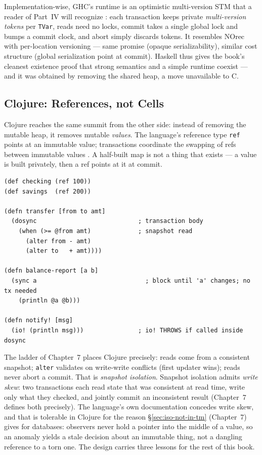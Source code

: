 Implementation-wise, GHC's runtime is an optimistic multi-version STM that a
reader of Part~IV will recognize \cite{ghcstm}: each transaction keeps private
\emph{multi-version tokens} per \texttt{TVar}, reads need no locks, commit
takes a single global lock and bumps a commit clock, and abort simply
discards tokens. It resembles NOrec with per-location versioning --- same
promise (opaque serializability), similar cost structure (global serialization
point at commit). Haskell thus gives the book's cleanest existence proof that
strong semantics and a simple runtime coexist --- and it was obtained by
removing the shared heap, a move unavailable to C.

\subsection{Clojure: References, not Cells}

Clojure reaches the same summit from the other side: instead of removing the
mutable heap, it removes mutable \emph{values}. The language's reference type
\texttt{ref} points at an immutable value; transactions coordinate the
swapping of refs between immutable values \cite{clojurestm}. A half-built map
is not a thing that exists --- a value is built privately, then a ref points
at it at commit.

\begin{lstlisting}[caption={Transfer, blocking read, and the \texttt{io!}
discipline in Clojure.}, label={lst:clojure-stm}]
(def checking (ref 100))
(def savings  (ref 200))

(defn transfer [from to amt]
  (dosync                            ; transaction body
    (when (>= @from amt)             ; snapshot read
      (alter from - amt)
      (alter to   + amt))))

(defn balance-report [a b]
  (sync a                              ; block until 'a' changes; no tx needed
    (println @a @b)))

(defn notify! [msg]
  (io! (println msg)))               ; io! THROWS if called inside dosync
\end{lstlisting}

The ladder of Chapter~7 places Clojure precisely: reads come from a
consistent snapshot; \texttt{alter} validates on write-write conflicts
(first updater wins); reads never abort a commit. That is \emph{snapshot
isolation}. Snapshot isolation admits \emph{write skew}: two transactions
each read state that was consistent at read time, write only what they
checked, and jointly commit an inconsistent result (Chapter~7 defines both
precisely). The language's own documentation concedes write skew, and that
is tolerable in Clojure for the reason \S\ref{sec:iso-not-in-tm}
(Chapter~7) gives
for databases: observers never hold a pointer into the middle of a value, so
an anomaly yields a stale decision about an immutable thing, not a dangling
reference to a torn one. The design carries three lessons for the rest of
this book.

